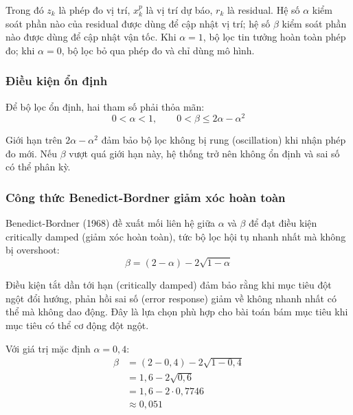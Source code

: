 Trong đó $z_k$ là phép đo vị trí, $x_k^p$ là vị trí dự báo, $r_k$ là residual. Hệ số $\alpha$ kiểm soát phần nào của residual được dùng để cập nhật vị trí; hệ số $\beta$ kiểm soát phần nào được dùng để cập nhật vận tốc. Khi $\alpha = 1$, bộ lọc tin tưởng hoàn toàn phép đo; khi $\alpha = 0$, bộ lọc bỏ qua phép đo và chỉ dùng mô hình.

\subsubsection{Điều kiện ổn định}

\hspace{0.5cm} Để bộ lọc ổn định, hai tham số phải thỏa mãn:
\begin{equation}
    0 < \alpha < 1, \qquad 0 < \beta \leq 2\alpha - \alpha^2
\end{equation}

Giới hạn trên $2\alpha - \alpha^2$ đảm bảo bộ lọc không bị rung (oscillation) khi nhận phép đo mới. Nếu $\beta$ vượt quá giới hạn này, hệ thống trở nên không ổn định và sai số có thể phân kỳ.

\subsubsection{Công thức Benedict-Bordner giảm xóc hoàn toàn}

\hspace{0.5cm} Benedict-Bordner (1968) đề xuất mối liên hệ giữa $\alpha$ và $\beta$ để đạt điều kiện critically damped (giảm xóc hoàn toàn), tức bộ lọc hội tụ nhanh nhất mà không bị overshoot:
\begin{equation}
    \beta = (2 - \alpha) - 2\sqrt{1 - \alpha}
\end{equation}

Điều kiện tắt dần tới hạn (critically damped) đảm bảo rằng khi mục tiêu đột ngột đổi hướng, phản hồi sai số (error response) giảm về không nhanh nhất có thể mà không dao động. Đây là lựa chọn phù hợp cho bài toán bám mục tiêu khi mục tiêu có thể cơ động đột ngột.

Với giá trị mặc định $\alpha = 0{,}4$:
\begin{align*}
    \beta &= (2 - 0{,}4) - 2\sqrt{1 - 0{,}4} \\
          &= 1{,}6 - 2\sqrt{0{,}6} \\
          &= 1{,}6 - 2 \cdot 0{,}7746 \\
          &\approx 0{,}051
\end{align*}

